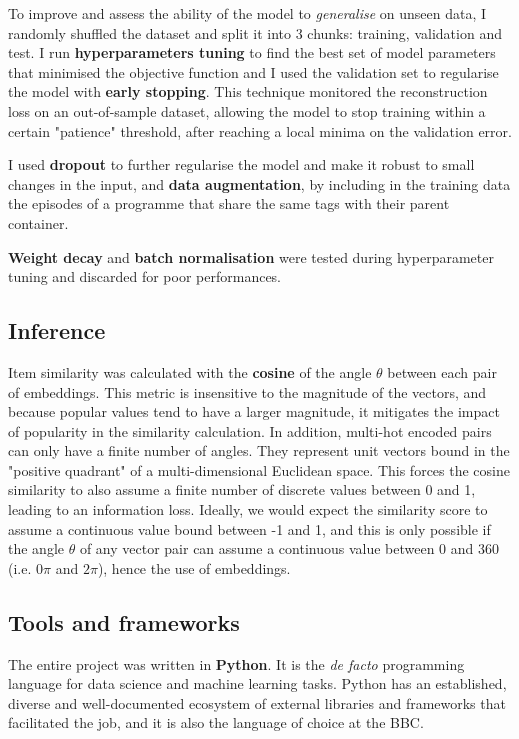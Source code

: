 To improve and assess the ability of the model to \textit{generalise} on unseen data, I randomly shuffled the dataset and split
it into 3 chunks: training, validation and test. I run \textbf{hyperparameters tuning} to find the best set of model parameters
that minimised the objective function and I used the validation set to regularise the model with \textbf{early stopping}.
This technique monitored the reconstruction loss on an out-of-sample dataset,
allowing the model to stop training within a certain "patience" threshold, after reaching a local minima on the validation error.

I used \textbf{dropout} to further regularise the model and make it robust to small changes in the input,
and \textbf{data augmentation}, by including in the training data the episodes of a programme that share the same tags with their
parent container.

\textbf{Weight decay} and \textbf{batch normalisation} were tested during hyperparameter tuning and discarded for poor performances.%

\subsection{Inference}

Item similarity was calculated with the \textbf{cosine} of the angle $\theta$ between each pair of embeddings. This metric
is insensitive to the magnitude of the vectors, and because popular values tend to have a larger magnitude, it mitigates the impact of
popularity in the similarity calculation. In addition, multi-hot encoded pairs can only have a finite number of angles.
They represent unit vectors bound in the "positive quadrant" of a multi-dimensional Euclidean space.
This forces the cosine similarity to also assume a finite number of discrete values between 0 and 1, leading to an information
loss. Ideally, we would expect the similarity score to assume a continuous value bound between -1 and 1, and this
is only possible if the angle $\theta$ of any vector pair can assume a continuous value between 0 and 360 (i.e. $0\pi$ and $2\pi$), hence
the use of embeddings.

\subsection{Tools and frameworks}

The entire project was written in \textbf{Python}. It is the \textit{de facto} programming language for data science
and machine learning tasks. Python has an established, diverse and well-documented ecosystem of external libraries
and frameworks that facilitated the job, and it is also the language of choice at the BBC.

